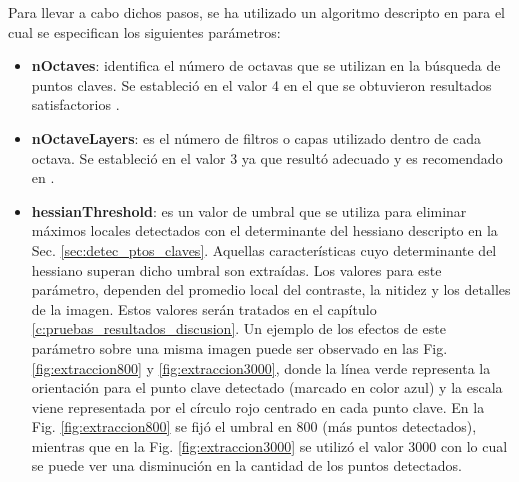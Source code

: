 Para llevar a cabo dichos pasos, se ha utilizado un algoritmo descripto en \cite{Bay06surf:speeded} para el cual se especifican los siguientes parámetros: %
\begin{itemize}
 \item \textbf{nOctaves}: identifica el número de octavas que se utilizan en la búsqueda de puntos claves. Se estableció en el valor 4 en el que se obtuvieron resultados satisfactorios \cite{Bay06surf:speeded}.
 \item \textbf{nOctaveLayers}: es el número de filtros o capas utilizado dentro de cada octava. Se estableció en el valor 3 ya que resultó adecuado y es recomendado en \cite{Bay06surf:speeded}.
 \item \textbf{hessianThreshold}: es un valor de umbral que se utiliza para eliminar máximos locales detectados con el determinante del hessiano descripto en la Sec. \ref{sec:detec_ptos_claves}. Aquellas características cuyo determinante del hessiano superan dicho umbral son extraídas. Los valores para este parámetro, dependen del promedio local del contraste, la nitidez y los detalles de la imagen. Estos valores serán tratados en el capítulo \ref{c:pruebas_resultados_discusion}. 
 Un ejemplo de los efectos de este parámetro sobre una misma imagen puede ser observado en las Fig. \ref{fig:extraccion800} y \ref{fig:extraccion3000}, donde la línea verde representa la orientación para el punto clave detectado (marcado en color azul) y la escala viene representada por el círculo rojo centrado en cada punto clave. En la Fig. \ref{fig:extraccion800} se fijó el umbral en 800 (más puntos detectados), mientras que en la Fig. \ref{fig:extraccion3000} se utilizó el valor 3000 con lo cual se puede ver una disminución en la cantidad de los puntos detectados.
\end{itemize}
